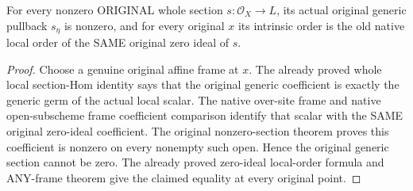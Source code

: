 \begin{lemma}
\label{lem:curve-generic-section-whole-zero-order}
\leanok
{}
For every nonzero ORIGINAL whole section $s:\mathcal O_X\to L$, its
actual original generic pullback $s_\eta$ is nonzero, and for every
original $x$ its intrinsic order is the old native local order of the
SAME original zero ideal of $s$.
\end{lemma}
\begin{proof}
Choose a genuine original affine frame at $x$.  The already proved
whole local section-Hom identity says that the original generic
coefficient is exactly the generic germ of the actual local scalar.
The native over-site frame and native open-subscheme frame coefficient
comparison identify that scalar with the SAME original zero-ideal
coefficient.  The original nonzero-section theorem proves this
coefficient is nonzero on every nonempty such open.  Hence the
original generic section cannot be zero.  The already proved
zero-ideal local-order formula and ANY-frame theorem give the claimed
equality at every original point.
\end{proof}

